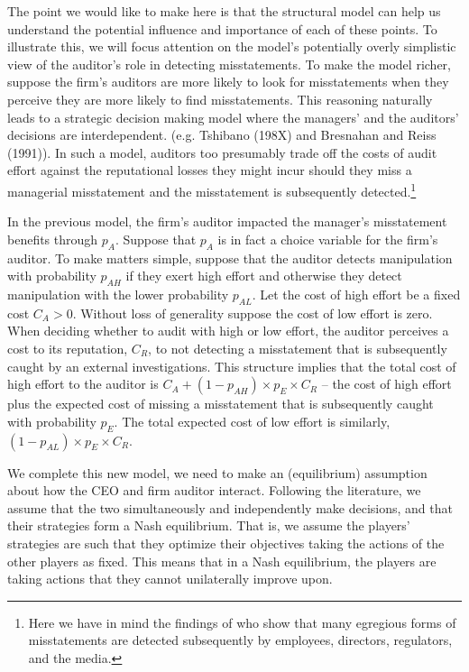 \documentclass[14pt]{article}
\begin{document}
The point we would like to make here is that the structural model can help us understand
the potential influence and importance of each of these points. To illustrate this,
we will focus attention on the model's potentially overly simplistic view of the
auditor's role in detecting misstatements.  To make the model richer, suppose the firm's 
auditors are more likely to look for misstatements when they perceive
they are more likely to find misstatements. This reasoning naturally
leads to a strategic decision making model where the managers' and the auditors' decisions are
interdependent. (e.g. Tshibano (198X) and Bresnahan and Reiss (1991)).
In such a model, auditors too presumably trade off the costs of audit effort against the
reputational losses they might incur should they miss a managerial misstatement and the misstatement is 
subsequently detected.\footnote{Here we have in mind the findings of \citet{Dyck:2010kh} who show that 
many egregious forms of misstatements are detected subsequently by employees, directors, 
regulators, and the media.} 

In the previous model, the firm's auditor impacted the manager's
misstatement benefits through $p_A$. Suppose that $p_A$ is in fact a choice variable for
the firm's auditor. To make matters simple, suppose that the auditor
detects manipulation with probability $p_{AH}$ if they exert high effort and 
otherwise they detect manipulation with the lower probability $p_{AL}$. 
Let the cost of high effort be a fixed cost $C_A > 0$. Without loss of generality
suppose the cost of low effort is zero. When deciding whether to audit with
high or low effort, the auditor perceives a cost to its reputation, $C_R$, 
to not detecting a misstatement that is subsequently caught by an external investigations. 
This structure implies that the total cost of high effort to the auditor is $C_A + (1-p_{AH}) \times 
p_E \times C_R$ -- the cost of high effort plus the expected cost of missing 
a misstatement that is subsequently caught with probability $p_E$. The total expected cost of
low effort is similarly, $(1-p_{AL}) \times p_E \times C_R$. 

We complete this new model, we need to make an (equilibrium) assumption about how the CEO and
firm auditor interact. Following the literature, we assume that the two simultaneously
and independently make decisions, and that their strategies form a Nash equilibrium.
That is, we assume the players' strategies are such that they optimize their objectives 
taking the actions of the other players as fixed. This means that in a Nash equilibrium, 
the players are taking actions that they cannot unilaterally improve upon.
\end{document}

